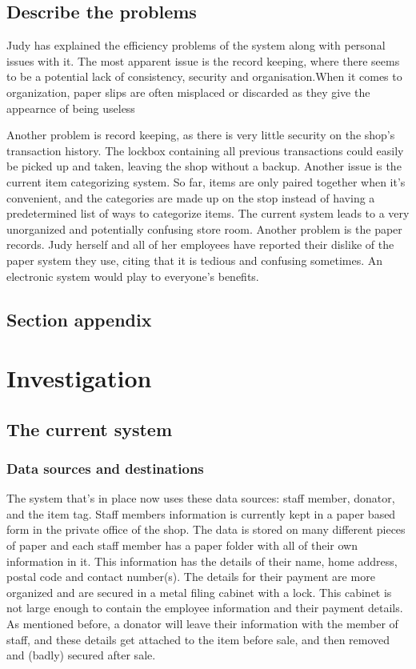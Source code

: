 \subsection{Describe the problems}
Judy has explained the efficiency problems of the system along with personal issues with it. The most apparent issue is the record keeping, where there seems to be a potential lack of consistency, security and organisation.When it comes to organization, paper slips are often misplaced or discarded as they give the appearnce of being useless

Another problem is record keeping, as there is very little security on the shop's transaction history. The lockbox containing all previous transactions could easily be picked up and taken, leaving the shop without a backup. Another issue is the current item categorizing system. So far, items are only paired together when it's convenient, and the categories are made up on the stop instead of having a predetermined list of ways to categorize items. The current system leads to a very unorganized and potentially confusing store room. Another problem is the paper records. Judy herself and all of her employees have reported their dislike of the paper system they use, citing that it is tedious and confusing sometimes. An electronic system would play to everyone's benefits.
\subsection{Section appendix}

\section{Investigation}

\subsection{The current system}

\subsubsection{Data sources and destinations}
The system that’s in place now uses these data sources: staff member, donator, and the item tag.
 Staff members information is currently kept in a paper based form in the private office of the shop. The data is stored on many different pieces of paper and each staff member has a paper folder with all of their own information in it. This information has the details of their name, home address, postal code and contact number(s). The details for their payment are more organized and are secured in a metal filing cabinet with a lock. This cabinet is not large enough to contain the employee information and their payment details. As mentioned before, a donator will leave their information with the member of staff, and these details get attached to the item before sale, and then removed and (badly) secured after sale.

